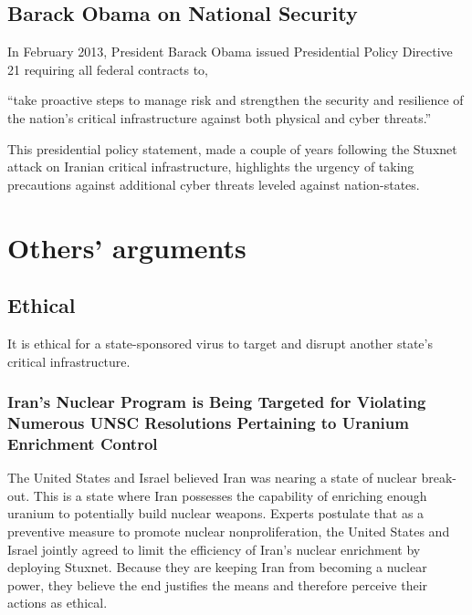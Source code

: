\documentclass[12pt]{article}
\begin{document}
\begin{multicols}{2}
\subsection{Barack Obama on National Security}

In February 2013, President Barack Obama issued Presidential Policy Directive 21 requiring all federal contracts to,

\begin{blockquote}
``take proactive steps to manage risk and strengthen the security and resilience of the nation's critical infrastructure against both physical and cyber threats.''\cite{industrialCyberVulnerabilities}
\end{blockquote}

This presidential policy statement, made a couple of years following the Stuxnet attack on Iranian critical infrastructure, highlights the urgency of taking precautions against additional cyber threats leveled against nation-states.

\section{Others' arguments}

\subsection{Ethical}

It is ethical for a state-sponsored virus to target and disrupt another state's critical infrastructure.

\subsubsection{Iran's Nuclear Program is Being Targeted for Violating Numerous UNSC Resolutions Pertaining to Uranium Enrichment Control}

The United States and Israel believed Iran was nearing a state of nuclear break-out. This is a state where Iran possesses the capability of enriching enough uranium to potentially build nuclear weapons. Experts postulate that as a preventive measure to promote nuclear nonproliferation, the United States and Israel jointly agreed to limit the efficiency of Iran's nuclear enrichment by deploying Stuxnet.\cite{theRealStoryOfStuxnet}  Because they are keeping Iran from becoming a nuclear power, they believe the end justifies the means and therefore perceive their actions as ethical.


\end{multicols}
\end{document}
